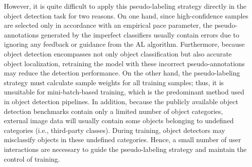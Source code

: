 \documentclass[journal]{IEEEtran}
\begin{document}
However, it is quite difficult to apply this pseudo-labeling strategy directly in the object detection task for two reasons. On one hand, {since} high-confidence samples are selected only in accordance with an empirical pace parameter, {the pseudo-annotations generated by the imperfect classifiers usually contain errors due to ignoring any feedback or guidance from the AL algorithm.} Furthermore, because object detection encompasses not only object classification but also accurate object localization, retraining the model with these incorrect pseudo-annotations may reduce the detection performance. On the other hand, the pseudo-labeling strategy must calculate sample weights for all training samples; thus, it is unsuitable for mini-batch-based training, which is the {predominant method used in} object detection pipelines. In addition, because the publicly available object detection benchmarks contain only a limited number of object categories, external image data {will usually contain some objects belonging to undefined} categories (i.e., third-party classes). During training, object detectors may misclassify {objects in} these undefined categories. Hence, a small number of user interactions are necessary to guide the pseudo-labeling strategy and maintain the control of training. 
\end{document}
